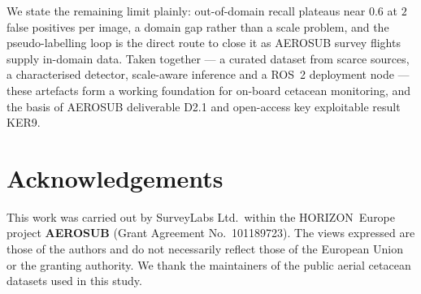\documentclass[11pt,a4paper]{article}
\begin{document}
We state the remaining limit plainly: out-of-domain recall plateaus near $0.6$ at
$2$ false positives per image, a domain gap rather than a scale problem, and the
pseudo-labelling loop is the direct route to close it as AEROSUB survey flights
supply in-domain data. Taken together --- a curated dataset from scarce sources,
a characterised detector, scale-aware inference and a ROS~2 deployment node ---
these artefacts form a working foundation for on-board cetacean monitoring, and
the basis of AEROSUB deliverable D2.1 and open-access key exploitable result
KER9.

\section*{Acknowledgements}
This work was carried out by SurveyLabs Ltd.\ within the HORIZON~Europe project
\textbf{AEROSUB} (Grant Agreement No.\ 101189723). The views expressed are those
of the authors and do not necessarily reflect those of the European Union or the
granting authority. We thank the maintainers of the public aerial cetacean
datasets used in this study.




\appendix
\end{document}
